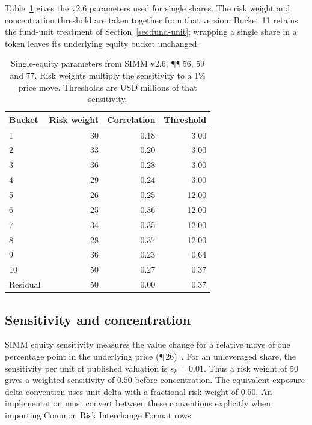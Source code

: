 Table~\ref{tab:equity-parameters} gives the v2.6 parameters used for single shares.
The risk weight and concentration threshold are taken together from that version.
Bucket 11 retains the fund-unit treatment of Section~\ref{sec:fund-unit}; wrapping
a single share in a token leaves its underlying equity bucket unchanged.

\begin{table}[htbp]
\centering\small
\caption{Single-equity parameters from SIMM v2.6, \P\P\,56, 59 and 77.
Risk weights multiply the sensitivity to a 1\% price move.
Thresholds are USD millions of that sensitivity.}
\label{tab:equity-parameters}
\begin{tabular}{@{}lrrr@{}}
\toprule
Bucket & Risk weight & Correlation & Threshold \\
\midrule
1 & 30 & 0.18 & 3.00 \\
2 & 33 & 0.20 & 3.00 \\
3 & 36 & 0.28 & 3.00 \\
4 & 29 & 0.24 & 3.00 \\
5 & 26 & 0.25 & 12.00 \\
6 & 25 & 0.36 & 12.00 \\
7 & 34 & 0.35 & 12.00 \\
8 & 28 & 0.37 & 12.00 \\
9 & 36 & 0.23 & 0.64 \\
10 & 50 & 0.27 & 0.37 \\
Residual & 50 & 0.00 & 0.37 \\
\bottomrule
\end{tabular}
\end{table}

\subsection{Sensitivity and concentration}\label{sec:equity-concentration}

SIMM equity sensitivity measures the value change for a relative move of one percentage point in the underlying price (\P\,26)~\citep{isda_simm_v2_6}.
For an unleveraged share, the sensitivity per unit of published valuation is
$s_k=0.01$. Thus a risk weight of 50 gives a weighted sensitivity of $0.50$
before concentration. The equivalent exposure-delta convention uses unit delta
with a fractional risk weight of $0.50$. An implementation must convert between
these conventions explicitly when importing Common Risk Interchange Format rows.

